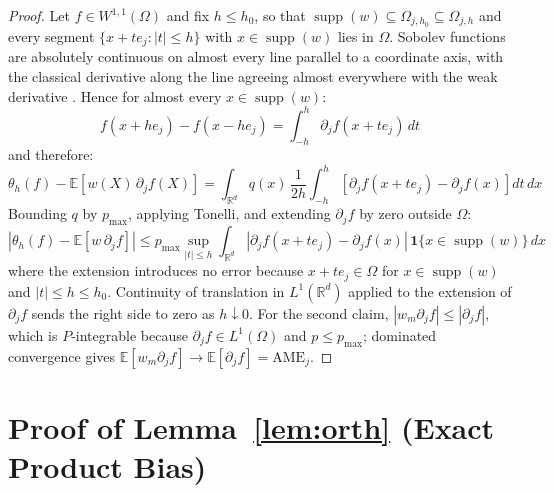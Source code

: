 \documentclass[12pt]{article}
\newcommand{\R}{\mathbb{R}}
\newcommand{\E}{\mathbb{E}}
\newcommand{\abs}[1]{\left| #1 \right|}
\begin{document}
	\begin{proof}
		Let $f \in W^{1,1}(\Omega)$ and fix $h \leq h_0$, so that
		$\operatorname{supp}(w) \subseteq \Omega_{j,h_0} \subseteq \Omega_{j,h}$ and
		every segment $\{x + t e_j : \abs{t} \leq h\}$ with
		$x \in \operatorname{supp}(w)$ lies in $\Omega$. Sobolev functions are
		absolutely continuous on almost every line parallel to a coordinate axis, with
		the classical derivative along the line agreeing almost everywhere with the
		weak derivative \citep[Section~4.9]{evans2015measure}. Hence for almost every
		$x \in \operatorname{supp}(w)$:
		\begin{equation}
			f(x + h e_j) - f(x - h e_j)
			= \int_{-h}^{h} \partial_j f(x + t e_j)\, dt
		\end{equation}
		and therefore:
		\begin{equation}
			\theta_h(f) - \E\left[w(X)\, \partial_j f(X)\right]
			= \int_{\R^d} q(x)\, \frac{1}{2h} \int_{-h}^{h}
			\left[\partial_j f(x + t e_j) - \partial_j f(x)\right] dt\, dx
		\end{equation}
		Bounding $q$ by $p_{\max}$, applying Tonelli, and extending
		$\partial_j f$ by zero outside $\Omega$:
		\begin{equation}
			\abs{\theta_h(f) - \E\left[w\, \partial_j f\right]}
			\leq p_{\max} \sup_{\abs{t} \leq h}
			\int_{\R^d} \abs{\partial_j f(x + t e_j) - \partial_j f(x)}
			\, \mathbf{1}\{x \in \operatorname{supp}(w)\}\, dx
		\end{equation}
		where the extension introduces no error because $x + t e_j \in \Omega$ for
		$x \in \operatorname{supp}(w)$ and $\abs{t} \leq h \leq h_0$. Continuity of
		translation in $L^1(\R^d)$ applied to the extension of $\partial_j f$ sends
		the right side to zero as $h \downarrow 0$. For the second claim,
		$\abs{w_m \partial_j f} \leq \abs{\partial_j f}$, which is $P$-integrable
		because $\partial_j f \in L^1(\Omega)$ and $p \leq p_{\max}$; dominated
		convergence gives
		$\E[w_m \partial_j f] \to \E[\partial_j f] = \mathrm{AME}_j$.
	\end{proof}
	
	\section{Proof of Lemma~\ref{lem:orth} (Exact Product Bias)}
	\label{app:lem_orth}
	
\end{document}
